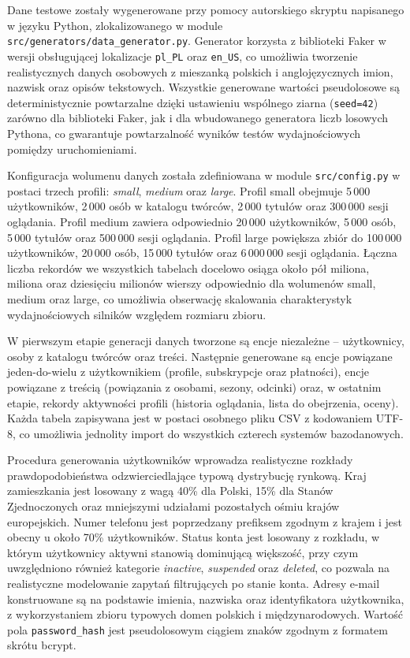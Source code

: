 Dane testowe zostały wygenerowane przy pomocy autorskiego skryptu napisanego
w języku Python, zlokalizowanego w module \texttt{src/generators/data\_generator.py}.
Generator korzysta z biblioteki Faker w wersji obsługującej lokalizacje
\texttt{pl\_PL} oraz \texttt{en\_US}, co umożliwia tworzenie realistycznych
danych osobowych z mieszanką polskich i anglojęzycznych imion, nazwisk oraz
opisów tekstowych. Wszystkie generowane wartości pseudolosowe są
deterministycznie powtarzalne dzięki ustawieniu wspólnego ziarna (\texttt{seed=42})
zarówno dla biblioteki Faker, jak i dla wbudowanego generatora liczb
losowych Pythona, co gwarantuje powtarzalność wyników testów wydajnościowych
pomiędzy uruchomieniami.

Konfiguracja wolumenu danych została zdefiniowana w module \texttt{src/config.py}
w postaci trzech profili: \textit{small}, \textit{medium} oraz \textit{large}.
Profil small obejmuje 5\,000 użytkowników, 2\,000 osób w katalogu twórców,
2\,000 tytułów oraz 300\,000 sesji oglądania. Profil medium zawiera
odpowiednio 20\,000 użytkowników, 5\,000 osób, 5\,000 tytułów oraz 500\,000
sesji oglądania. Profil large powiększa zbiór do 100\,000 użytkowników,
20\,000 osób, 15\,000 tytułów oraz 6\,000\,000 sesji oglądania. Łączna liczba
rekordów we wszystkich tabelach docelowo osiąga około pół miliona, miliona
oraz dziesięciu milionów wierszy odpowiednio dla wolumenów small, medium
oraz large, co umożliwia obserwację skalowania charakterystyk wydajnościowych
silników względem rozmiaru zbioru.

W pierwszym etapie generacji danych tworzone są encje
niezależne -- użytkownicy, osoby z katalogu twórców oraz treści. Następnie
generowane są encje powiązane jeden-do-wielu z użytkownikiem (profile,
subskrypcje oraz płatności), encje powiązane z treścią (powiązania
z osobami, sezony, odcinki) oraz, w ostatnim etapie, rekordy aktywności
profili (historia oglądania, lista do obejrzenia, oceny). Każda tabela
zapisywana jest w postaci osobnego pliku CSV z kodowaniem UTF-8, co
umożliwia jednolity import do wszystkich czterech systemów bazodanowych.

Procedura generowania użytkowników wprowadza realistyczne rozkłady
prawdopodobieństwa odzwierciedlające typową dystrybucję rynkową. Kraj
zamieszkania jest losowany z wagą 40\% dla Polski, 15\% dla Stanów
Zjednoczonych oraz mniejszymi udziałami pozostałych ośmiu krajów
europejskich. Numer telefonu jest poprzedzany prefiksem zgodnym z krajem
i jest obecny u około 70\% użytkowników. Status konta jest losowany
z rozkładu, w którym użytkownicy aktywni stanowią dominującą większość,
przy czym uwzględniono również kategorie \textit{inactive}, \textit{suspended}
oraz \textit{deleted}, co pozwala na realistyczne modelowanie zapytań
filtrujących po stanie konta. Adresy e-mail konstruowane są na podstawie
imienia, nazwiska oraz identyfikatora użytkownika, z wykorzystaniem zbioru
typowych domen polskich i międzynarodowych. Wartość pola
\texttt{password\_hash} jest pseudolosowym ciągiem znaków zgodnym
z formatem skrótu bcrypt.


